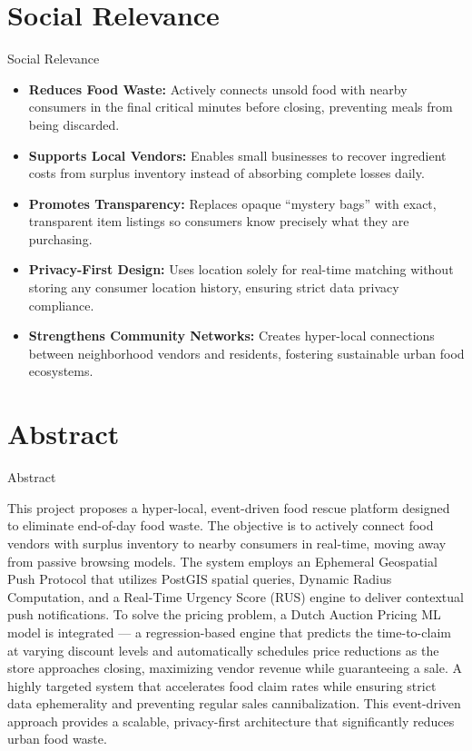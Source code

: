 \documentclass[aspectratio=169,xcolor=dvipsnames]{beamer}
\begin{document}
\section{Social Relevance}
\begin{frame}{Social Relevance}
\justifying

\begin{itemize}
    \item \textbf{Reduces Food Waste:} Actively connects unsold food with nearby consumers in the final critical minutes before closing, preventing meals from being discarded.

    \item \textbf{Supports Local Vendors:} Enables small businesses to recover ingredient costs from surplus inventory instead of absorbing complete losses daily.

    \item \textbf{Promotes Transparency:} Replaces opaque ``mystery bags'' with exact, transparent item listings so consumers know precisely what they are purchasing.

    \item \textbf{Privacy-First Design:} Uses location solely for real-time matching without storing any consumer location history, ensuring strict data privacy compliance.

    \item \textbf{Strengthens Community Networks:} Creates hyper-local connections between neighborhood vendors and residents, fostering sustainable urban food ecosystems.
\end{itemize}

\end{frame}

\section{Abstract}
\begin{frame}{Abstract}
\justifying

This project proposes a hyper-local, event-driven food rescue platform designed to eliminate end-of-day food waste. The objective is to actively connect food vendors with surplus inventory to nearby consumers in real-time, moving away from passive browsing models. The system employs an Ephemeral Geospatial Push Protocol that utilizes PostGIS spatial queries, Dynamic Radius Computation, and a Real-Time Urgency Score (RUS) engine to deliver contextual push notifications. To solve the pricing problem, a Dutch Auction Pricing ML model is integrated — a regression-based engine that predicts the time-to-claim at varying discount levels and automatically schedules price reductions as the store approaches closing, maximizing vendor revenue while guaranteeing a sale. A highly targeted system that accelerates food claim rates while ensuring strict data ephemerality and preventing regular sales cannibalization. This event-driven approach provides a scalable, privacy-first architecture that significantly reduces urban food waste.

\end{frame}
\end{document}
